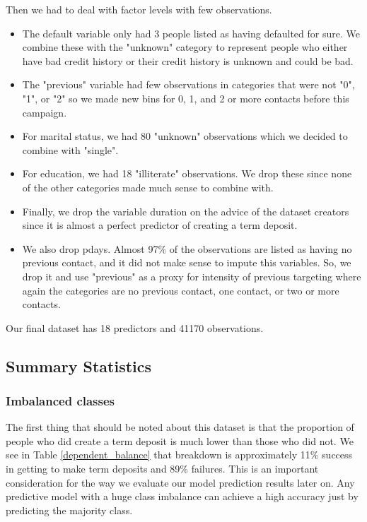 \documentclass[12pt]{article}
\begin{document}
Then we had to deal with factor levels with few observations. 
\begin{itemize}
    \item The default variable only had 3 people listed as having defaulted for sure. We combine these with the "unknown" category to represent people who either have bad credit history or their credit history is unknown and could be bad. 

    \item The "previous" variable had few observations in categories that were not "0", "1", or "2" so we made new bins for 0, 1, and 2 or more contacts before this campaign. 

    \item For marital status, we had 80 "unknown" observations which we decided to combine with "single". 

    \item For education, we had 18 "illiterate" observations. We drop these since none of the other categories made much sense to combine with. 
    
    \item Finally, we drop the variable duration on the advice of the dataset creators since it is almost a perfect predictor of creating a term deposit. 
    
    \item We also drop pdays. Almost 97\% of the observations are listed as having no previous contact, and it did not make sense to impute this variables. So, we drop it and use "previous" as a proxy for intensity of previous targeting where again the categories are no previous contact, one contact, or two or more contacts. 
\end{itemize}
Our final dataset has 18 predictors and 41170 observations.

\subsection*{Summary Statistics}
\subsubsection*{Imbalanced classes}
The first thing that should be noted about this dataset is that the proportion of people who did create a term deposit is much lower than those who did not. We see in Table \ref{dependent_balance} that breakdown is approximately 11\% success in getting to make term deposits and 89\% failures. This is an important consideration for the way we evaluate our model prediction results later on. Any predictive model with a huge class imbalance can achieve a high accuracy just by predicting the majority class.
\end{document}
